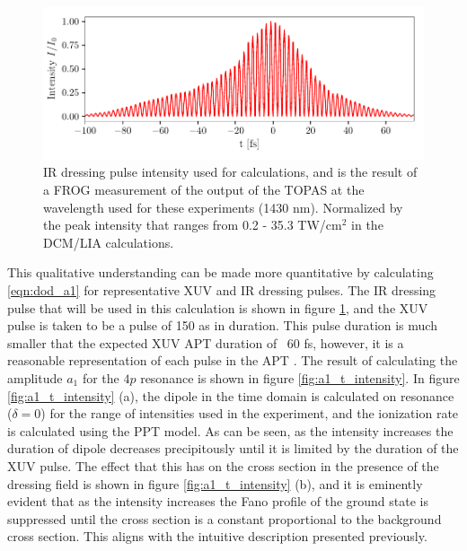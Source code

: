 \begin{figure}
	\centering
	\includegraphics[width=1.0\textwidth]{figures/ATS/fields.pdf}
	\caption[IR dressing pulse used in DCM/LIA calculations]{IR dressing pulse intensity used for calculations, and is the result of a FROG measurement of the output of the TOPAS at the wavelength used for these experiments (1430 nm). Normalized by the peak intensity that ranges from 0.2 - 35.3 TW/cm$^2$ in the DCM/LIA calculations.}
	\label{fig:fields}
\end{figure}

This qualitative understanding can be made more quantitative by calculating \ref{eqn:dod_a1} for representative XUV and IR dressing pulses.  The IR dressing pulse that will be used in this calculation is shown in figure \ref{fig:fields}, and the XUV pulse is taken to be a pulse of 150 as in duration.  This pulse duration is much smaller that the expected XUV APT duration of ~60 fs, however, it is a reasonable representation of each pulse in the APT \cite{paulObservationTrainAttosecond2001, agostiniPhysicsAttosecondLight2004, orfanosAttosecondPulseMetrology2019, chirlaAttosecondPulseGeneration2011}.  The result of calculating the amplitude $a_1$ for the $4p$ resonance is shown in figure \ref{fig:a1_t_intensity}. In figure \ref{fig:a1_t_intensity} (a), the dipole in the time domain is calculated on resonance ($\delta=0$) for the range of intensities used in the experiment, and the ionization rate is calculated using the PPT model.  As can be seen, as the intensity increases the duration of dipole decreases precipitously until it is limited by the duration of the XUV pulse. The effect that this has on the cross section in the presence of the dressing field is shown in figure \ref{fig:a1_t_intensity} (b), and it is eminently evident that as the intensity increases the Fano profile of the ground state is suppressed until the cross section is a constant proportional to the background cross section.  This aligns with the intuitive description presented previously.  

